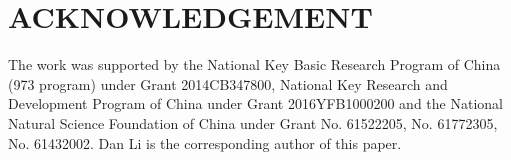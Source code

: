 \documentclass{apnet18}
\begin{document}
\section*{ACKNOWLEDGEMENT}
The work was supported by the National Key Basic Research Program of China (973 program) under Grant 2014CB347800, National Key Research and Development Program of China under Grant 2016YFB1000200 and the National Natural Science Foundation of China under Grant No. 61522205, No. 61772305, No. 61432002. Dan Li is the corresponding author of this paper.


\begin{small}
	
\end{small}
\label{last-page}
\end{document}
